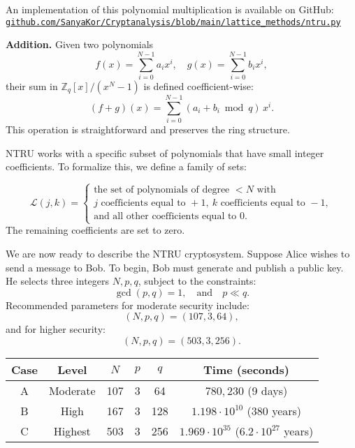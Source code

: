 \documentclass[a4paper,12pt]{article}
\begin{document}
\smallskip
\noindent
An implementation of this polynomial multiplication is available on GitHub:  
\href{https://github.com/SanyaKor/Cryptanalysis/blob/main/lattice\_methods/ntru.py}{\texttt{github.com/SanyaKor/Cryptanalysis/blob/main/lattice\_methods/ntru.py}}

\smallskip
\noindent\textbf{Addition.}
Given two polynomials
\[
f(x) = \sum_{i=0}^{N-1} a_i x^i, \quad g(x) = \sum_{i=0}^{N-1} b_i x^i,
\]
their sum in \( \mathbb{Z}_q[x]/(x^N - 1) \) is defined coefficient-wise:
\[
(f + g)(x) = \sum_{i=0}^{N-1} (a_i + b_i \bmod q)\, x^i.
\]
This operation is straightforward and preserves the ring structure.


\medskip
\noindent
NTRU works with a specific subset of polynomials that have small integer coefficients. To formalize this, we define a family of sets:

\[
\mathcal{L}(j, k) = 
\left\{
  \begin{array}{l}
    \text{the set of polynomials of degree } < N \text{ with} \\
    j \text{ coefficients equal to } +1,\ k \text{ coefficients equal to } -1, \\
    \text{and all other coefficients equal to } 0.
  \end{array}
\right.
\]
The remaining coefficients are set to zero.

\medskip

\noindent
We are now ready to describe the NTRU cryptosystem. Suppose Alice wishes to send a message to Bob. To begin, Bob must generate and publish a public key. He selects three integers \( N, p, q \), subject to the constraints:
\[
\gcd(p, q) = 1, \quad \text{and} \quad p \ll q.
\]
Recommended parameters for moderate security include:
\[
(N, p, q) = (107, 3, 64),
\]
and for higher security:
\[
(N, p, q) = (503, 3, 256).
\]

\begin{table}[h!]
\centering
\begin{tabular}{|c|c|c|c|c|c|}
\hline
\textbf{Case} & \textbf{Level} & \boldmath$N$ & \boldmath$p$ & \boldmath$q$ & \textbf{Time (seconds)} \\
\hline
A & Moderate & 107 & 3 & 64 & $780,\!230$ (9 days) \\
\hline
B & High & 167 & 3 & 128 & $1.198 \cdot 10^{10}$ (380 years) \\
\hline
C & Highest & 503 & 3 & 256 & $1.969 \cdot 10^{35}$ ($6.2 \cdot 10^{27}$ years) \\
\hline
\end{tabular}
\end{table}
\end{document}
